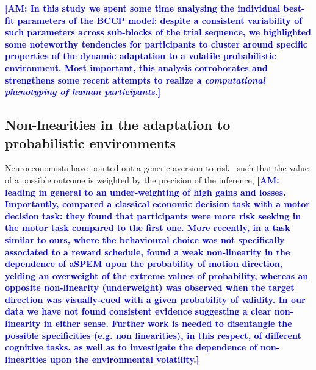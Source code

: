\documentclass[12pt,english]{article}%
\newcommand{\citep}[1]{\parencite{#1}}
\newcommand{\citet}[1]{\textcite{#1}}
\newcommand{\AM}[1]{\textbf{\textcolor{blue}{[AM: #1]}}}
\begin{document}
\AM{In this study we spent some time analysing the individual best-fit parameters of the BCCP model: despite a consistent variability of such parameters across sub-blocks of the trial sequence, we highlighted some noteworthy tendencies for participants to cluster around specific properties of the dynamic adaptation to a volatile probabilistic environment. Most important, this analysis corroborates and strengthens some recent attempts to realize a \textit{computational phenotyping of human participants.}} 


\subsection{Non-lnearities in the adaptation to probabilistic environments}
Neuroeconomists have pointed out a generic aversion to risk~\citep{Kahneman13}
such that the value of a possible outcome
is weighted by the precision of the inference, \AM{leading in general to an under-weighting of high gains and losses. Importantly, \citet{WuDelgadoMaloney2012} compared a classical economic decision task with a motor decision task: they found that participants were more risk seeking in the motor task compared to the first one. More recently, in a task similar to ours, where the behavioural choice was not specifically associated to a reward schedule,
\citet{SantosKowler2017} found a weak non-linearity in the dependence of aSPEM upon the probability of motion direction, yelding an overweight of the extreme values of probability, whereas an opposite non-linearity (underweight) was observed when the target direction was visually-cued with a given probability of validity. In our data we have not found consistent evidence suggesting a clear non-linearity in either sense. Further work is needed to disentangle the possible specificities (e.g. non linearities), in this respect, of different cognitive tasks, as well as to investigate the dependence of non-linearities upon the environmental volatility.}
\end{document}
